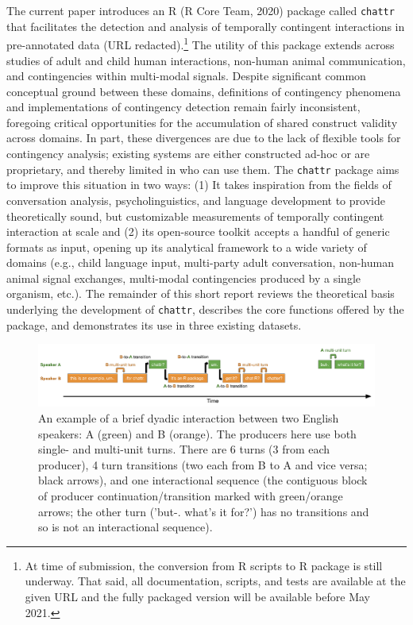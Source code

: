 \documentclass[10pt, letterpaper]{article}
\newenvironment{CodeChunk}{}{}
\begin{document}
The current paper introduces an R (R Core Team, 2020) package called
\texttt{chattr} that facilitates the detection and analysis of
temporally contingent interactions in pre-annotated data (URL
redacted).\footnote{At time of submission, the conversion from R scripts
  to R package is still underway. That said, all documentation, scripts,
  and tests are available at the given URL and the fully packaged
  version will be available before May 2021.} The utility of this
package extends across studies of adult and child human interactions,
non-human animal communication, and contingencies within multi-modal
signals. Despite significant common conceptual ground between these
domains, definitions of contingency phenomena and implementations of
contingency detection remain fairly inconsistent, foregoing critical
opportunities for the accumulation of shared construct validity across
domains. In part, these divergences are due to the lack of flexible
tools for contingency analysis; existing systems are either constructed
ad-hoc or are proprietary, and thereby limited in who can use them. The
\texttt{chattr} package aims to improve this situation in two ways: (1)
It takes inspiration from the fields of conversation analysis,
psycholinguistics, and language development to provide theoretically
sound, but customizable measurements of temporally contingent
interaction at scale and (2) its open-source toolkit accepts a handful
of generic formats as input, opening up its analytical framework to a
wide variety of domains (e.g., child language input, multi-party adult
conversation, non-human animal signal exchanges, multi-modal
contingencies produced by a single organism, etc.). The remainder of
this short report reviews the theoretical basis underlying the
development of \texttt{chattr}, describes the core functions offered by
the package, and demonstrates its use in three existing datasets.

\begin{CodeChunk}
\begin{figure}[h]

{\centering \includegraphics{figs/minisequence-1} 

}

\caption[An example of a brief dyadic interaction between two English speakers]{An example of a brief dyadic interaction between two English speakers: A (green) and B (orange). The producers here use both single- and multi-unit turns. There are 6 turns (3 from each producer), 4 turn transitions (two each from B to A and vice versa; black arrows), and one interactional sequence (the contiguous block of producer continuation/transition marked with green/orange arrows; the other turn ('but-. what's it for?') has no transitions and so is not an interactional sequence).}\label{fig:minisequence}
\end{figure}
\end{CodeChunk}
\end{document}
